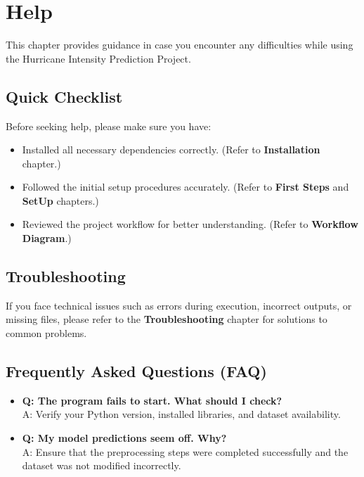 %
%

\chapter{Help}

This chapter provides guidance in case you encounter any difficulties while using the Hurricane Intensity Prediction Project.

\section*{Quick Checklist}
Before seeking help, please make sure you have:
\begin{itemize}
	\item Installed all necessary dependencies correctly. (Refer to \textbf{Installation} chapter.)
	\item Followed the initial setup procedures accurately. (Refer to \textbf{First Steps} and \textbf{SetUp} chapters.)
	\item Reviewed the project workflow for better understanding. (Refer to \textbf{Workflow Diagram}.)
\end{itemize}

\section*{Troubleshooting}
If you face technical issues such as errors during execution, incorrect outputs, or missing files, please refer to the \textbf{Troubleshooting} chapter for solutions to common problems.

\section*{Frequently Asked Questions (FAQ)}
\begin{itemize}
	\item \textbf{Q: The program fails to start. What should I check?} \\
	A: Verify your Python version, installed libraries, and dataset availability.
	
	\item \textbf{Q: My model predictions seem off. Why?} \\
	A: Ensure that the preprocessing steps were completed successfully and the dataset was not modified incorrectly.
\end{itemize}

